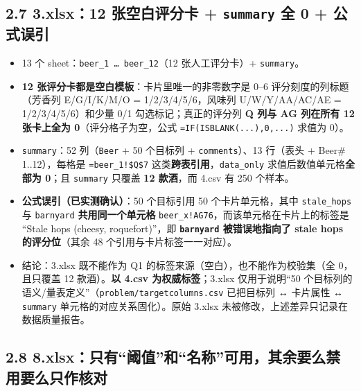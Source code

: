 \documentclass[
  11pt,
]{ctexart}
\providecommand{\tightlist}{%
  \setlength{\itemsep}{0pt}\setlength{\parskip}{0pt}}
\begin{document}
\subsection{\texorpdfstring{2.7 3.xlsx：12 张空白评分卡 +
\texttt{summary} 全 0 +
公式误引}{2.7 3.xlsx：12 张空白评分卡 + summary 全 0 + 公式误引}}\label{xlsx12-ux5f20ux7a7aux767dux8bc4ux5206ux5361-summary-ux5168-0-ux516cux5f0fux8befux5f15}

\begin{itemize}
\tightlist
\item
  13 个 sheet：\texttt{beer\_\allowbreak{}1\ …\ beer\_\allowbreak{}12}（12 张人工评分卡）+
  \texttt{summary}。
\item
  \textbf{12 张评分卡都是空白模板}：卡片里唯一的非零数字是 0--6
  评分刻度的列标题（芳香列 E/G/I/K/M/O = 1/2/3/4/5/6，风味列
  U/W/Y/AA/AC/AE = 1/2/3/4/5/6）和少量 0/1 勾选标记；真正的评分列
  \textbf{Q 列与 AG 列在所有 12 张卡上全为 0}（评分格子为空，公式
  \texttt{=IF(ISBLANK(.\allowbreak{}.\allowbreak{}.\allowbreak{}),0,.\allowbreak{}.\allowbreak{}.\allowbreak{})} 求值为 0）。
\item
  \texttt{summary}：52 列（\texttt{Beer} + 50 个目标列 +
  \texttt{comments}）、13 行（表头 + Beer\# 1..12），每格是
  \texttt{=beer\_\allowbreak{}1!\$Q\$7} 这类\textbf{跨表引用}，\texttt{data\_only}
  求值后数值单元格\textbf{全部为 0}；且 \texttt{summary} 只覆盖
  \textbf{12 款酒}，而 4.csv 有 250 个样本。
\item
  \textbf{公式误引（已实测确认）}：50 个目标引用 50 个卡片单元格，其中
  \texttt{stale\_hops} 与 \texttt{barnyard} \textbf{共用同一个单元格}
  \texttt{beer\_x!AG76}，而该单元格在卡片上的标签是 ``Stale hops
  (cheesy, roquefort)''，即 \textbf{\texttt{barnyard} 被错误地指向了
  stale hops 的评分位}（其余 48 个引用与卡片标签一一对应）。
\item
  结论：3.xlsx 既不能作为 Q1 的标签来源（空白），也不能作为校验集（全
  0，且只覆盖 12 款酒）。\textbf{以 4.csv 为权威标签}；3.xlsx
  仅用于说明``50
  个目标列的语义/量表定义''（\texttt{problem/\allowbreak{}targetcolumns.\allowbreak{}csv}
  已把目标列 ↔ 卡片属性 ↔ \texttt{summary} 单元格的对应关系固化）。原始
  3.xlsx 未被修改，上述差异只记录在数据质量报告。
\end{itemize}

\subsection{2.8
8.xlsx：只有``阈值''和``名称''可用，其余要么禁用要么只作核对}\label{xlsxux53eaux6709ux9608ux503cux548cux540dux79f0ux53efux7528ux5176ux4f59ux8981ux4e48ux7981ux7528ux8981ux4e48ux53eaux4f5cux6838ux5bf9}
\end{document}
